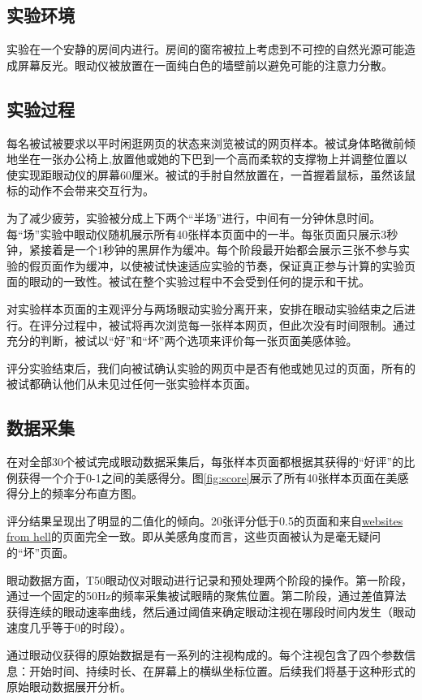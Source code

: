 \documentclass[master, fontset=mac, openany, oneside, zihao=-4]{sjtuthesis}
\begin{document}
\subsection{实验环境}
实验在一个安静的房间内进行。房间的窗帘被拉上考虑到不可控的自然光源可能造成屏幕反光。眼动仪被放置在一面纯白色的墙壁前以避免可能的注意力分散。

\subsection{实验过程}
每名被试被要求以平时闲逛网页的状态来浏览被试的网页样本。被试身体略微前倾地坐在一张办公椅上,放置他或她的下巴到一个高而柔软的支撑物上并调整位置以使实现距眼动仪的屏幕60厘米。被试的手肘自然放置在，一首握着鼠标，虽然该鼠标的动作不会带来交互行为。

为了减少疲劳，实验被分成上下两个“半场”进行，中间有一分钟休息时间。每“场”实验中眼动仪随机展示所有40张样本页面中的一半。每张页面只展示3秒钟，紧接着是一个1秒钟的黑屏作为缓冲。每个阶段最开始都会展示三张不参与实验的假页面作为缓冲，以使被试快速适应实验的节奏，保证真正参与计算的实验页面的眼动的一致性。被试在整个实验过程中不会受到任何的提示和干扰。

对实验样本页面的主观评分与两场眼动实验分离开来，安排在眼动实验结束之后进行。在评分过程中，被试将再次浏览每一张样本网页，但此次没有时间限制。通过充分的判断，被试以“好”和“坏”两个选项来评价每一张页面美感体验。

评分实验结束后，我们向被试确认实验的网页中是否有他或她见过的页面，所有的被试都确认他们从未见过任何一张实验样本页面。

\subsection{数据采集}
在对全部30个被试完成眼动数据采集后，每张样本页面都根据其获得的“好评”的比例获得一个介于0-1之间的美感得分。图\ref{fig:score}展示了所有40张样本页面在美感得分上的频率分布直方图。

评分结果呈现出了明显的二值化的倾向。20张评分低于0.5的页面和来自\href{https://websitesfromhell.net/}{websites from hell}的页面完全一致。即从美感角度而言，这些页面被认为是毫无疑问的“坏”页面。

眼动数据方面，T50眼动仪对眼动进行记录和预处理两个阶段的操作。第一阶段，通过一个固定的50Hz的频率采集被试眼睛的聚焦位置。第二阶段，通过差值算法获得连续的眼动速率曲线，然后通过阈值来确定眼动注视在哪段时间内发生（眼动速度几乎等于0的时段）。

通过眼动仪获得的原始数据是有一系列的注视构成的。每个注视包含了四个参数信息：开始时间、持续时长、在屏幕上的横纵坐标位置。后续我们将基于这种形式的原始眼动数据展开分析。
\end{document}
